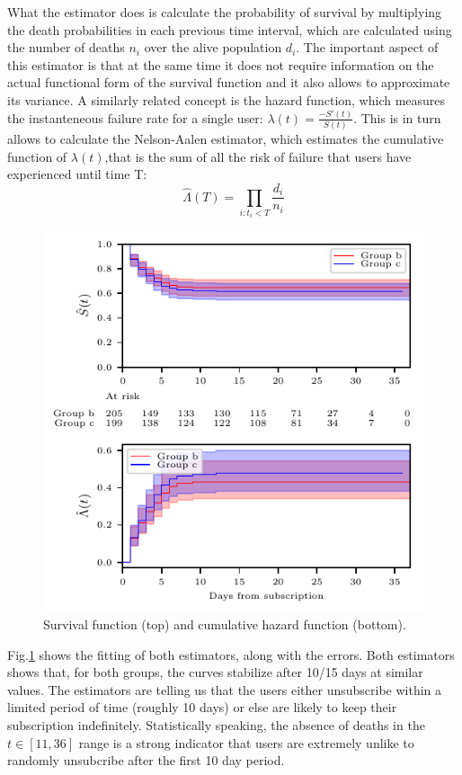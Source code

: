 \documentclass[paper=a4, fontsize=10pt]{report}
\begin{document}
What the estimator does is calculate the probability of survival by multiplying the death probabilities in each previous time interval, which
are calculated using the number of deaths $n_{i}$ over the alive population $d_{i}$. The important aspect of this 
estimator is that at the same time it does not require information on the actual functional form of the survival function
and it also allows to approximate its variance. A similarly related concept is the hazard function, which measures
the instanteneous failure rate for a single user: $ \lambda (t) = \frac{-S'(t)}{S(t)}
$. This is in turn allows to calculate the Nelson-Aalen estimator, which estimates the cumulative function of $\lambda(t)$,that
is the sum of all the risk of failure that users have experienced until time T:
\begin{equation}
 \hat{\Lambda}(T) = \prod_{i: t_{i} < T}  \frac{d_{i}}{n_{i}}
\end{equation}



\begin{figure}[h!]
\centering
\includegraphics[scale = 0.99]{survival.pdf}
\caption{Survival function (top) and cumulative hazard function (bottom).}
\label{fig:survival}
\end{figure}

Fig.\ref{fig:survival} shows the fitting of both estimators, along with the errors. Both estimators shows that, for both groups,
the curves stabilize after 10/15 days at similar values. The estimators are telling us that the users
either unsubscribe within a limited period of time (roughly 10 days) or else are likely to keep their subscription indefinitely. Statistically
speaking, the absence of deaths in the $t \in [11,36]$ range is a strong indicator that users are extremely unlike to randomly
unsubcribe after the first 10 day period. 
\end{document}
